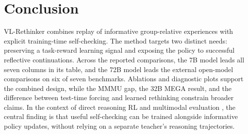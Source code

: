 \documentclass[10pt,twocolumn]{article}
\newcommand{\model}{VL-Rethinker\xspace}
\begin{document}
\section{Conclusion}
\model combines replay of informative group-relative experiences with explicit training-time self-checking. The method targets two distinct needs: preserving a task-reward learning signal and exposing the policy to successful reflective continuations. Across the reported comparisons, the 7B model leads all seven columns in its table, and the 72B model leads the external open-model comparisons on six of seven benchmarks. Ablations and diagnostic plots support the combined design, while the MMMU gap, the 32B MEGA result, and the difference between test-time forcing and learned rethinking constrain broader claims. In the context of direct reasoning RL and multimodal evaluation \citep{deepseek-r1,emma}, the central finding is that useful self-checking can be trained alongside informative policy updates, without relying on a separate teacher's reasoning trajectories.

\small


\end{document}

